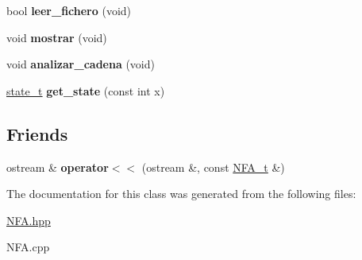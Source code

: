 \begin{DoxyCompactItemize}
bool {\bfseries leer\+\_\+fichero} (void)
\item 
\hypertarget{classNFA__t_a2b8b231719724a77f09dc046eb88cdd6}{}\label{classNFA__t_a2b8b231719724a77f09dc046eb88cdd6} 
void {\bfseries mostrar} (void)
\item 
\hypertarget{classNFA__t_ac1fb24c08ad84061d9b959337028e114}{}\label{classNFA__t_ac1fb24c08ad84061d9b959337028e114} 
void {\bfseries analizar\+\_\+cadena} (void)
\item 
\hypertarget{classNFA__t_ac5ef73ae518c6fb6fe16786ab089b634}{}\label{classNFA__t_ac5ef73ae518c6fb6fe16786ab089b634} 
\hyperlink{classstate__t}{state\+\_\+t} {\bfseries get\+\_\+state} (const int x)
\end{DoxyCompactItemize}
\subsection*{Friends}
\begin{DoxyCompactItemize}
\item 
\hypertarget{classNFA__t_a3bc15c79632fcee1a2fa8f5c0dca6425}{}\label{classNFA__t_a3bc15c79632fcee1a2fa8f5c0dca6425} 
ostream \& {\bfseries operator$<$$<$} (ostream \&, const \hyperlink{classNFA__t}{N\+F\+A\+\_\+t} \&)
\end{DoxyCompactItemize}


The documentation for this class was generated from the following files\+:\begin{DoxyCompactItemize}
\item 
\hyperlink{NFA_8hpp}{N\+F\+A.\+hpp}\item 
N\+F\+A.\+cpp\end{DoxyCompactItemize}
